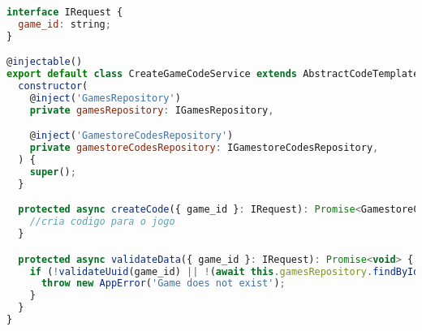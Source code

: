 \begin{lstlisting}[language=JavaScript, caption={Cadastro de Códigos para Jogos},captionpos=b, label=alg:ocpexample]
interface IRequest {
  game_id: string;
}

@injectable()
export default class CreateGameCodeService extends AbstractCodeTemplate {
  constructor(
    @inject('GamesRepository')
    private gamesRepository: IGamesRepository,

    @inject('GamestoreCodesRepository')
    private gamestoreCodesRepository: IGamestoreCodesRepository,
  ) {
    super();
  }

  protected async createCode({ game_id }: IRequest): Promise<GamestoreCode> {
    //cria codigo para o jogo
  }

  protected async validateData({ game_id }: IRequest): Promise<void> {
    if (!validateUuid(game_id) || !(await this.gamesRepository.findById(game_id))) {
      throw new AppError('Game does not exist');
    }
  }
}
\end{lstlisting}